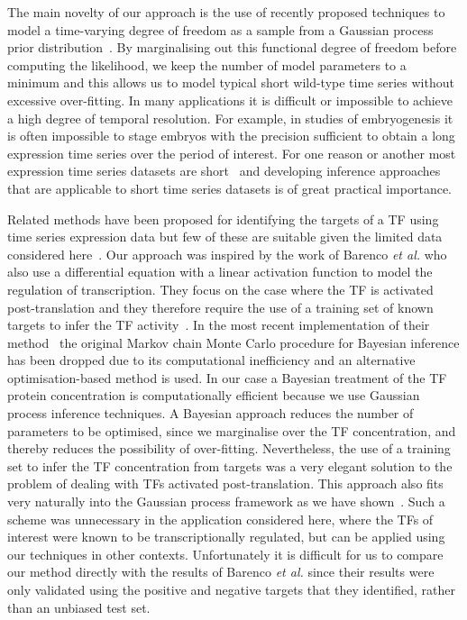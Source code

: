 \documentclass{pnastwo}
\begin{document}
\begin{article}
The main novelty of our approach is the use of recently proposed
techniques to model a time-varying degree of freedom as a sample from
a Gaussian process prior distribution~\cite{Gao2008}. By marginalising out this functional
degree of freedom before computing the likelihood, we keep the
number of model parameters to a minimum and this allows us to model
typical short wild-type time series without excessive over-fitting. In
many applications it is difficult or impossible to achieve a high
degree of temporal resolution. For example, in studies of
embryogenesis it is often impossible to stage embryos with the
precision sufficient to obtain a long expression time series over the
period of interest. For one reason or another most expression time
series datasets are short~\cite{Ernst2005} and developing inference approaches
that are applicable to short time series datasets is of great
practical importance.  

Related methods have been proposed for identifying the
targets of a TF using time series expression data but few of these are suitable given the
limited data considered here~\cite{Bansal2007a}. Our approach was inspired by the work of Barenco {\em et
al.} who also use a differential equation with a linear activation
function to model the regulation of transcription. They focus on the
case where the TF is activated post-translation and they therefore
require the use of a training set of
known targets to infer the TF activity~\cite{Barenco2006a}. In the most recent
implementation of their method~\cite{Barenco2009} the original Markov
chain Monte Carlo procedure for Bayesian inference has been dropped due to its computational
inefficiency and an alternative optimisation-based method is used. In our case a Bayesian treatment of the TF protein
concentration is computationally efficient because we use Gaussian
process inference techniques. A Bayesian approach reduces the number of parameters
to be optimised, since we marginalise over the TF concentration, and
thereby reduces the possibility of over-fitting. Nevertheless, the use of a training set to infer the
TF concentration from targets was a very elegant solution to the
problem of dealing with TFs activated post-translation. This
approach also fits very naturally into the Gaussian process
framework as we have shown~\cite{Gao2008}. Such a scheme was unnecessary in the application considered
here, where the TFs of interest were known to be transcriptionally
regulated, but can be applied using our techniques in other
contexts. Unfortunately it is difficult for us to compare our method
directly with the results of Barenco {\em et al.} since their results
were only validated using the positive and negative targets that they identified,
rather than an unbiased test set. 


\end{article}
\end{document}
